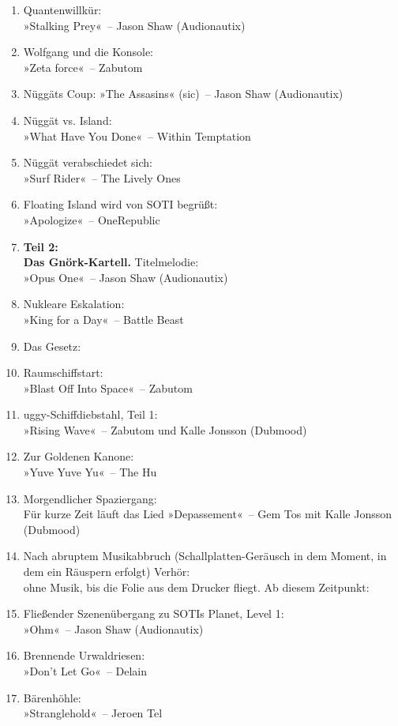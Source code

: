 \begin{enumerate}
    \item Quantenwillkür:\\ »Stalking Prey«~– Jason Shaw (Audionautix)
    \item Wolfgang und die Konsole:\\ »Zeta force«~– Zabutom
    \item Nüggäts Coup: »The Assasins« (sic)~– Jason Shaw (Audionautix)
    \item Nüggät vs. Island:\\ »What Have You Done«~– Within Temptation
    \item Nüggät verabschiedet sich:\\ »Surf Rider«~– The Lively Ones
    \item Floating Island wird von SOTI begrüßt:\\ »Apologize«~– OneRepublic
    \item \textbf{Teil 2:\\ Das Gnörk-Kartell.} Titelmelodie:\\ »Opus One«~– Jason Shaw (Audionautix)
    \item Nukleare Eskalation:\\ »King for a Day«~– Battle Beast
    \item Das Gesetz:
    \item Raumschiffstart:\\ »Blast Off Into Space«~– Zabutom
    \item uggy-Schiffdiebstahl, Teil 1:\\ »Rising Wave«~– Zabutom und Kalle Jonsson (Dubmood)
    \item Zur Goldenen Kanone:\\ »Yuve Yuve Yu«~– The Hu
    \item Morgendlicher Spaziergang:\\ Für kurze Zeit läuft das Lied »Depassement«~– Gem Tos mit Kalle Jonsson (Dubmood)
    \item Nach abruptem Musikabbruch (Schallplatten-Geräusch in dem Moment, in dem ein Räuspern erfolgt) Verhör:\\ ohne Musik, bis die Folie aus dem Drucker fliegt. Ab diesem Zeitpunkt:
    \item Fließender Szenenübergang zu SOTIs Planet, Level 1:\\ »Ohm«~– Jason Shaw (Audionautix)
    \item Brennende Urwaldriesen:\\ »Don’t Let Go«~– Delain
    \item Bärenhöhle:\\ »Stranglehold«~– Jeroen Tel

\end{enumerate}
